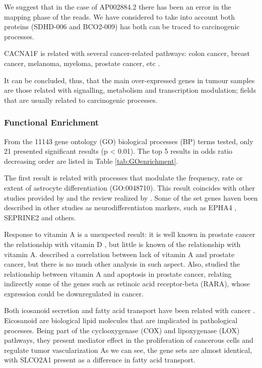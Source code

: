 \documentclass[9pt,twocolumn,twoside]{gsajnl}
\begin{document}
We suggest that in the case of AP002884.2 there has been an error in the mapping phase of the reads. We have considered to take into account both proteins (SDHD-006 and BCO2-009) has both can be traced to carcinogenic processes.

CACNA1F is related with several cancer-related pathways: colon cancer, breast cancer, melanoma, myeloma, prostate cancer, etc \cite{tcng}.

It can be concluded, thus, that the main over-expressed genes in tumour samples are those related with signalling, metabolism and transcription modulation; fields that are usually related to carcinogenic processes.

\subsubsection*{Functional Enrichment}

From the 11143 gene ontology (GO) biological processes (BP) terms tested, only 21 presented significant results (p < 0.01). The top 5 results in odds ratio decreasing order are listed in Table \ref{tab:GOenrichment}.

The first result is related with processes that modulate the frequency, rate or extent of astrocyte differentiation (GO:0048710). This result coincides with other studies provided by \cite{neuroendocrine3, neuroendocrine2} and the review realized by \cite{neuroendocrine1}. Some of the set genes haven been described in other studies as neurodifferentiaton markers, such as EPHA4 \cite{neuroendocrine_EPA}, SEPRINE2 \cite{mckee2013protease} and others. 

Response to vitamin A is a unexpected result: it is well known in prostate cancer the relationship with vitamin D \citep{vitamin0,vitamind1,vitamind2,vitamind3}, but little is known of the relationship with vitamin A. \cite{vitamina1} described a correlation between lack of vitamin A and prostate cancer, but there is no much other analysis in such aspect. Also, \cite{vitamina2} studied the relationship between vitamin A and apoptosis in prostate cancer, relating indirectly some of the genes such as retinoic acid receptor-beta (RARA), whose expression could be downregulated in cancer. 

Both icosanoid secretion and fatty acid transport have been related with cancer \citep{fat1,fat2}. Eicosanoid are biological lipid molecules that are implicated in pathological processes. Being part of the  cyclooxygenase (COX) and lipoxygenase (LOX) pathways, they present mediator effect in the proliferation of cancerous cells and regulate tumor vascularization \citep{fatvascu} As we can see, the gene sets are almost identical, with SLCO2A1 present as a difference in fatty acid transport. 
\end{document}
